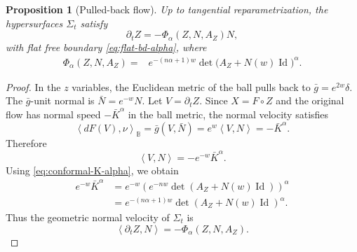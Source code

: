 \documentclass[11pt, reqno]{amsart}
\newtheorem{proposition}[theorem]{Proposition}
\theoremstyle{remark}
\theoremstyle{definition}
\numberwithin{equation}{section}
\newcommand{\Id}{\operatorname{Id}}
\newcommand{\B}{\mathbb B}
\newcommand{\ip}[2]{\left\langle #1,#2\right\rangle}
\begin{document}
\begin{proposition}[Pulled-back flow]\label{prop:pulled-back-alpha}
Up to tangential reparametrization, the hypersurfaces $\Sigma_t$ satisfy
\begin{equation}\label{s4.flow-pb}
        \partial_tZ=-\Phi_\alpha(Z,N,A_Z)N,
\end{equation}
with flat free boundary \eqref{eq:flat-bd-alpha}, where
\begin{align}
        \Phi_\alpha(Z,N,A_Z)=&e^{-(n\alpha+1)w}
        \det\big(A_Z+N(w)\Id\big)^\alpha.\label{eq:Phi-alpha-explicit}
\end{align}
\end{proposition}

\begin{proof}
In the $z$ variables, the Euclidean metric of the ball pulls back to
$\bar g=e^{2w}\delta$.  The $\bar g$-unit normal is $\bar N=e^{-w}N$.
Let $V=\partial_tZ$.  Since $X=F\circ Z$ and the original flow has normal
speed $-\bar K^\alpha$ in the ball metric, the normal velocity satisfies
\begin{equation*}
        \ip{dF(V)}{\nu}_{\B}=\bar g(V,\bar N)
        =e^w\ip{V}{N}=-\bar K^\alpha.
\end{equation*}
Therefore
\begin{equation*}
        \ip{V}{N}=-e^{-w}\bar K^\alpha.
\end{equation*}
Using \eqref{eq:conformal-K-alpha}, we obtain
\begin{equation*}
\begin{aligned}
        e^{-w}\bar K^\alpha
        &=e^{-w}\left(e^{-nw}\det(A_Z+N(w)\Id)\right)^\alpha  \\
        &=e^{-(n\alpha+1)w}\det(A_Z+N(w)\Id)^\alpha.
\end{aligned}
\end{equation*}
Thus the geometric normal velocity of $\Sigma_t$ is
\begin{equation*}
        \ip{\partial_tZ}{N}=-\Phi_\alpha(Z,N,A_Z).
\end{equation*}


\end{proof}
\end{document}
